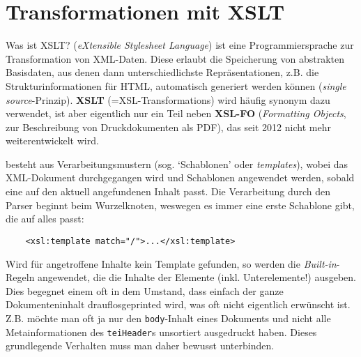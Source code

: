 

\section{Transformationen mit XSLT}

\begin{frame}{Was ist XSLT?}
 (\emph{eXtensible Stylesheet Language}) ist eine Programmiersprache zur Transformation von XML-Daten. Diese erlaubt die Speicherung von abstrakten Basisdaten, aus denen dann unterschiedlichste Repräsentationen, z.B. die Strukturinformationen für HTML, automatisch generiert werden können (\emph{single source}-Prinzip).  \textbf{XSLT} (=XSL-Transformations) wird häufig synonym dazu verwendet, ist aber eigentlich nur ein Teil neben \textbf{XSL-FO} (\emph{Formatting Objects}, zur Beschreibung von Druckdokumenten als PDF), das seit 2012 nicht mehr weiterentwickelt wird.

 besteht aus Verarbeitungsmustern (sog. `Schablonen' oder \emph{templates}), wobei das XML-Dokument durchgegangen wird und Schablonen angewendet werden, sobald eine auf den aktuell angefundenen Inhalt passt. Die Verarbeitung durch den Parser beginnt beim Wurzelknoten, weswegen es immer eine erste Schablone gibt, die auf alles passt:
\begin{verbatim}
    <xsl:template match="/">...</xsl:template>
\end{verbatim}
Wird für angetroffene Inhalte kein Template gefunden, so werden die \emph{Built-in}-Regeln angewendet, die die Inhalte der Elemente (inkl. Unterelemente!) ausgeben. Dies begegnet einem oft in dem Umstand, dass einfach der ganze Dokumenteninhalt drauflosgeprinted wird, was oft nicht eigentlich erwünscht ist. Z.B. möchte man oft ja nur den \texttt{body}-Inhalt eines Dokuments und nicht alle Metainformationen des \texttt{teiHeader}s unsortiert ausgedruckt haben. Dieses grundlegende Verhalten muss man daher bewusst unterbinden. 

\end{frame}

